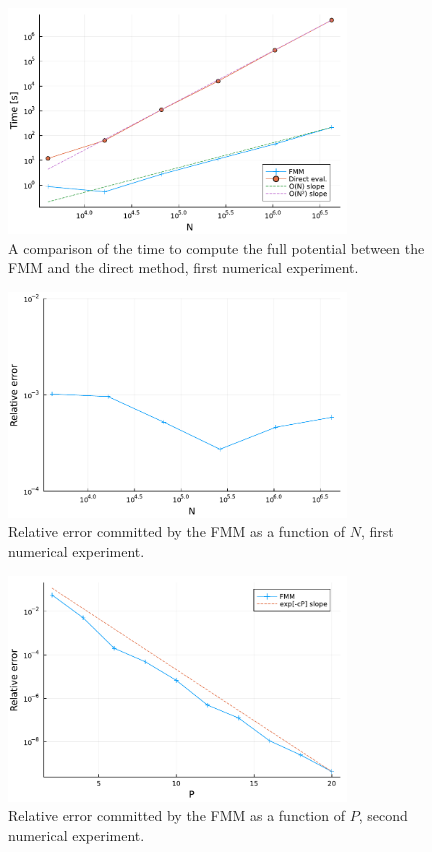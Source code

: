 \documentclass[final,onefignum,onetabnum]{siamart220329}
\begin{document}
\clearpage
\begin{figure}[h!]
	\centering
	\includegraphics[width=0.8\textwidth]{nscaling}
	\caption{A comparison of the time to compute the full potential between the FMM and the direct method, first numerical experiment.}
	\label{fig:nscaling}
\end{figure}
\begin{figure}[h!]
\centering
\includegraphics[width=0.8\textwidth]{errscaling}
\caption{Relative error committed by the FMM as a function of $N$, first numerical experiment.}
\label{fig:errscaling}
\end{figure}
\clearpage
\begin{figure}[h!]
\centering
\includegraphics[width=0.8\textwidth]{perror}
\caption{Relative error committed by the FMM as a function of $P$, second numerical experiment.}
\label{fig:perror}
\end{figure}
\end{document}
